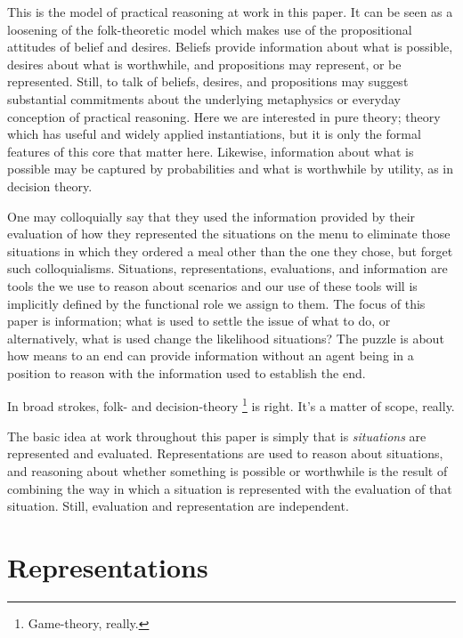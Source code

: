 \documentclass[10pt]{article}
\begin{document}
This is the model of practical reasoning at work in this paper.
It can be seen as a loosening of the folk-theoretic model which makes use of the propositional attitudes of belief and desires.
Beliefs provide information about what is possible, desires about what is worthwhile, and propositions may represent, or be represented.
Still, to talk of beliefs, desires, and propositions may suggest substantial commitments about the underlying metaphysics or everyday conception of practical reasoning.
Here we are interested in pure theory; theory which has useful and widely applied instantiations, but it is only the formal features of this core that matter here.
Likewise, information about what is possible may be captured by probabilities and what is worthwhile by utility, as in decision theory.

One may colloquially say that they used the information provided by their evaluation of how they represented the situations on the menu to eliminate those situations in which they ordered a meal other than the one they chose, but forget such colloquialisms.
Situations, representations, evaluations, and information are tools the we use to reason about scenarios and our use of these tools will is implicitly defined by the functional role we assign to them.
The focus of this paper is information; what is used to settle the issue of what to do, or alternatively, what is used change the likelihood situations?
The puzzle is about how means to an end can provide information without an agent being in a position to reason with the information used to establish the end.

In broad strokes, folk- and decision-theory\nolinebreak
\footnote{Game-theory, really.}
is right.
It's a matter of scope, really.





The basic idea at work throughout this paper is simply that is \emph{situations} are represented and evaluated.
Representations are used to reason about situations, and reasoning about whether something is possible or worthwhile is the result of combining the way in which a situation is represented with the evaluation of that situation.
Still, evaluation and representation are independent.


\newpage

\section{Representations}
\label{sec:representations}
\end{document}
